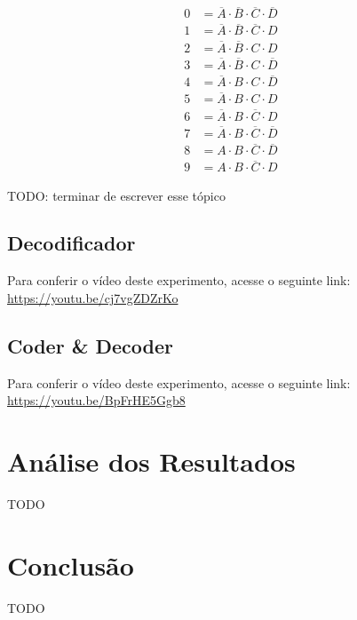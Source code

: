\documentclass[12pt]{article}
\begin{document}
\begin{align}
0 &= \overline{A} \cdot \overline{B} \cdot \overline{C} \cdot \overline{D} \\
1 &= \overline{A} \cdot \overline{B} \cdot \overline{C} \cdot D \\
2 &= \overline{A} \cdot \overline{B} \cdot C \cdot D \\
3 &= \overline{A} \cdot \overline{B} \cdot C \cdot \overline{D} \\
4 &= \overline{A} \cdot B \cdot C \cdot \overline{D} \\
5 &= \overline{A} \cdot B \cdot C \cdot D \\
6 &= \overline{A} \cdot B \cdot \overline{C} \cdot D \\
7 &= \overline{A} \cdot B \cdot \overline{C} \cdot \overline{D} \\
8 &= A \cdot B \cdot \overline{C} \cdot \overline{D} \\
9 &= A \cdot B \cdot \overline{C} \cdot D
\end{align}

TODO: terminar de escrever esse tópico

\subsection{Decodificador}\label{sec:todooo}

Para conferir o vídeo deste experimento, acesse o seguinte link:
\href{https://youtu.be/cj7vgZDZrKo}{https://youtu.be/cj7vgZDZrKo}

\subsection{Coder \& Decoder}\label{sec:ham}

Para conferir o vídeo deste experimento, acesse o seguinte link:
\href{https://youtu.be/BpFrHE5Ggb8}{https://youtu.be/BpFrHE5Ggb8}

\section{Análise dos Resultados}
\label{sec:Resultados}

TODO

\section{Conclusão}
\label{sec:Conclusao}

TODO
\end{document}

